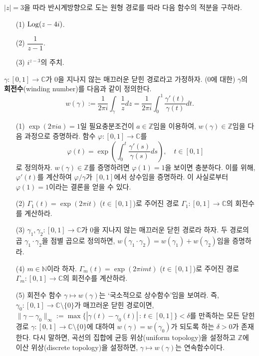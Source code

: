 \begin{salt_exercise} \label{ex-3-20}
$|z|=3$을 따라 반시계방향으로 도는 원형 경로를 따라 다음 함수의 적분을 구하라.
\begin{itemize}
\item[(1)] $\mathop{\mathrm{Log}} (z-4i)$.
\item[(2)] $\dfrac1{z-1}$.
\item[(3)] $i^{z-3}$의 주치.
\end{itemize}
\end{salt_exercise}

\begin{salt_exercise} \label{ex-3-21}
$\gamma:[0,1]\to\mathbb C$가 $0$을 지나지 않는
매끄러운 닫힌 경로라고 가정하자. ($0$에 대한) $\gamma$의 {\bf 회전수}(winding number)를 
다음과 같이 정의한다.
\[
w(\gamma) := \dfrac1{2\pi i}\int_\gamma \dfrac 1z dz
= \dfrac1{2\pi i}\int_0^1 \dfrac{\gamma'(t)}{\gamma(t)}dt.
\]
\begin{itemize}
\item[(1)] $\exp(2\pi ia)=1$일 필요충분조건이 $a\in\mathbb Z$임을 이용하여,
$w(\gamma)\in\mathbb Z$임을 다음 과정으로 증명하라.
함수 $\varphi:[0,1] \to\mathbb C$를 
\[
\varphi(t) = \exp\left( \int_0^t \dfrac{\gamma'(s)}{\gamma(s)}ds\right),
\quad t\in[0,1]
\]
로 정의하자.  $w(\gamma)\in\mathbb Z$를 증명하려면
$\varphi(1)=1$을 보이면 충분하다.
이를 위해, $\varphi'(t)$를 계산하여 $\varphi/\gamma$가 $[0,1]$에서 상수임을 증명하라.
이 사실로부터 $\varphi(1)=1$이라는 결론을 얻을 수 있다.
\item[(2)] $\Gamma_1(t)=\exp(2\pi it)$ ($t\in[0,1]$)로 주어진 경로 $\Gamma_1:[0,1]\to\mathbb C$의
회전수를 계산하라.
\item[(3)] $\gamma_1, \gamma_2:[0,1]\to\mathbb C$가 $0$을 지나지 않는
매끄러운 닫힌 경로라 하자. 두 경로의 곱 $\gamma_1\cdot\gamma_2$을
점별 곱으로 정의하면, $w(\gamma_1\cdot\gamma_2) = w(\gamma_1)+w(\gamma_2)$임을
증명하라.
\item[(4)] $m\in \mathbb N$이라 하자. 
$\Gamma_m(t)=\exp(2\pi imt)$ ($t\in[0,1]$)로 주어진 경로 $\Gamma_m:[0,1]\to\mathbb C$의
회전수를 계산하라.
\item[(5)] 회전수 함수 $\gamma \mapsto w(\gamma)$는
`국소적으로 상수함수'임을 보여라.
즉, $\gamma_0:[0,1]\to\mathbb C\setminus\{0\}$가 매끄러운 닫힌 경로이면,
$\|\gamma -\gamma_0\|_\infty := \max\{ |\gamma(t) - \gamma_0(t)| \,:\, t\in[0,1]\}<\delta$를
만족하는 모든 닫힌 경로 $\gamma:[0,1]\to\mathbb C\setminus\{0\}$에 대하여
$w(\gamma) = w(\gamma_0)$가 되도록 하는 $\delta>0$가 존재한다.
다시 말하면, 곡선의 집합에 균등 위상(uniform topology)을 설정하고
$\mathbb Z$에 이산 위상(discrete topology)을  설정하면,
$\gamma \mapsto w(\gamma)$는 연속함수이다.
\end{itemize}
\end{salt_exercise}

